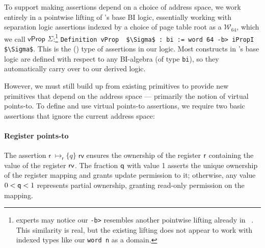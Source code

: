 To support making assertions depend on a choice of address space, we work entirely in a pointwise lifting of \iris's base BI logic,
essentially working with separation logic assertions indexed by a choice of page table root as a $\mathcal{W}_{64}$, which we call $\textsf{vProp }\Sigma$:\footnote{
  \iris experts may notice our \lstinline|-b>| resembles another pointwise lifting already in  \iris~\cite{dang2019rustbelt,dang2022compass}. 
  This similarity is real, but the existing lifting does not appear to work with indexed \coq types like our \lstinline|word n| as a domain.
}
\lstinline[language=Coq]|Definition vProp  $\Sigma$ : bi := word 64 -b> iPropI  $\Sigma$|.
This is the (\rocq) type of assertions in our logic.
Most constructs in \iris's base logic are defined with respect to any BI-algebra (of \coq type \lstinline|bi|), so they automatically
carry over to our derived logic.

However, we must still build up from existing \iris primitives to provide new primitives that depend on the address space --- primarily the notion
of virtual points-to.
To define and use virtual points-to assertions, we require two basic assertions that ignore
the current address space:

\paragraph{Register points-to} 
The assertion $\textsf{r}\;\mapsto_{\textsf{r}}\{q\}\;\textsf{rv}$ ensures the ownership of the register $\mathsf{r}$ containing the value of the register $\mathsf{rv}$. 
The fraction $\mathsf{q}$ with value 1 asserts the unique ownership of the register mapping and grants update permission to it;
otherwise, any value $0 < \mathsf{q} <1$ represents partial ownership, granting read-only permission on the mapping.

